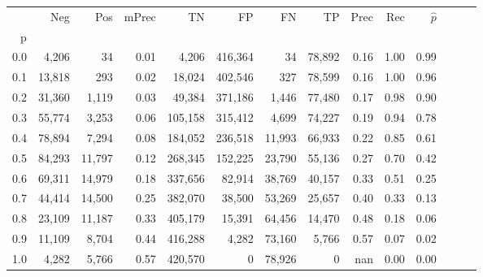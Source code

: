 \begin{tabular}{rrrrrrrrrrrrrr}
\toprule
{} &     Neg &     Pos & mPrec &       TN &       FP &      FN &      TP &  Prec &   Rec & $\hat{p}$ \\
p   &         &         &       &          &          &         &         &       &       &           \\
\midrule
0.0 &   4,206 &      34 &  0.01 &    4,206 &  416,364 &      34 &  78,892 &  0.16 &  1.00 &      0.99 \\
0.1 &  13,818 &     293 &  0.02 &   18,024 &  402,546 &     327 &  78,599 &  0.16 &  1.00 &      0.96 \\
0.2 &  31,360 &   1,119 &  0.03 &   49,384 &  371,186 &   1,446 &  77,480 &  0.17 &  0.98 &      0.90 \\
0.3 &  55,774 &   3,253 &  0.06 &  105,158 &  315,412 &   4,699 &  74,227 &  0.19 &  0.94 &      0.78 \\
0.4 &  78,894 &   7,294 &  0.08 &  184,052 &  236,518 &  11,993 &  66,933 &  0.22 &  0.85 &      0.61 \\
0.5 &  84,293 &  11,797 &  0.12 &  268,345 &  152,225 &  23,790 &  55,136 &  0.27 &  0.70 &      0.42 \\
0.6 &  69,311 &  14,979 &  0.18 &  337,656 &   82,914 &  38,769 &  40,157 &  0.33 &  0.51 &      0.25 \\
0.7 &  44,414 &  14,500 &  0.25 &  382,070 &   38,500 &  53,269 &  25,657 &  0.40 &  0.33 &      0.13 \\
0.8 &  23,109 &  11,187 &  0.33 &  405,179 &   15,391 &  64,456 &  14,470 &  0.48 &  0.18 &      0.06 \\
0.9 &  11,109 &   8,704 &  0.44 &  416,288 &    4,282 &  73,160 &   5,766 &  0.57 &  0.07 &      0.02 \\
1.0 &   4,282 &   5,766 &  0.57 &  420,570 &        0 &  78,926 &       0 &   nan &  0.00 &      0.00 \\
\bottomrule
\end{tabular}
